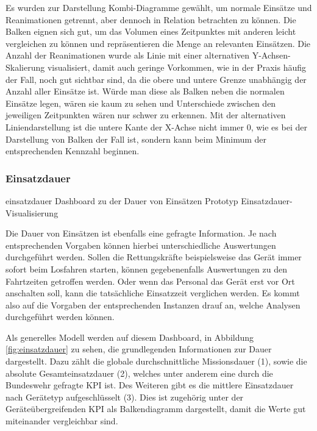 Es wurden zur Darstellung Kombi-Diagramme gewählt, um normale Einsätze und Reanimationen getrennt, aber dennoch in Relation betrachten zu können.
Die Balken eignen sich gut, um das Volumen eines Zeitpunktes mit anderen leicht vergleichen zu können und repräsentieren die Menge an relevanten Einsätzen.
Die Anzahl der Reanimationen wurde als Linie mit einer alternativen Y-Achsen-Skalierung visualisiert, damit auch geringe Vorkommen, wie in der Praxis häufig der Fall, noch gut sichtbar sind, da die obere und untere Grenze unabhängig der Anzahl aller Einsätze ist.
Würde man diese als Balken neben die normalen Einsätze legen, wären sie kaum zu sehen und Unterschiede zwischen den jeweiligen Zeitpunkten wären nur schwer zu erkennen.
Mit der alternativen Liniendarstellung ist die untere Kante der X-Achse nicht immer 0, wie es bei der Darstellung von Balken der Fall ist, sondern kann beim Minimum der entsprechenden Kennzahl beginnen.

\subsubsection{Einsatzdauer}
\label{subsub:dauer}
\bildbreit
{einsatzdauer}
{Dashboard zu der Dauer von Einsätzen}
{Prototyp Einsatzdauer-Visualisierung}

Die Dauer von Einsätzen ist ebenfalls eine gefragte Information. 
Je nach entsprechenden Vorgaben können hierbei unterschiedliche Auswertungen durchgeführt werden.
Sollen die Rettungskräfte beispielsweise das Gerät immer sofort beim Losfahren starten, können gegebenenfalls Auswertungen zu den Fahrtzeiten getroffen werden.
Oder wenn das Personal das Gerät erst vor Ort anschalten soll, kann die tatsächliche Einsatzzeit verglichen werden.
Es kommt also auf die Vorgaben der entsprechenden Instanzen drauf an, welche Analysen durchgeführt werden können.

Als generelles Modell werden auf diesem Dashboard, in Abbildung \ref{fig:einsatzdauer} zu sehen, die grundlegenden Informationen zur Dauer dargestellt.
Dazu zählt die globale durchschnittliche Missionsdauer (1), sowie die absolute Gesamteinsatzdauer (2), welches unter anderem eine durch die Bundeswehr gefragte \gls{KPI} ist.
Des Weiteren gibt es die mittlere Einsatzdauer nach Gerätetyp aufgeschlüsselt (3). 
Dies ist zugehörig unter der Geräteübergreifenden \gls{KPI} als Balkendiagramm dargestellt, damit die Werte gut miteinander vergleichbar sind.


